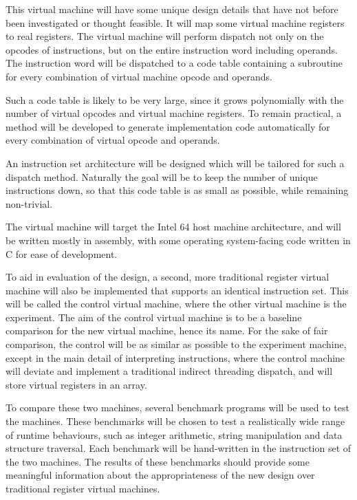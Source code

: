 		This virtual machine will have some unique design details that have not before been investigated or thought feasible. It will map some virtual machine registers to real registers. The virtual machine will perform dispatch not only on the opcodes of instructions, but on the entire instruction word including operands. The instruction word will be dispatched to a code table containing a subroutine for every combination of virtual machine opcode and operands. 
		
		Such a code table is likely to be very large, since it grows polynomially with the number of virtual opcodes and virtual machine registers. To remain practical, a method will be developed to generate implementation code automatically for every combination of virtual opcode and operands. 
	
		An instruction set architecture will be designed which will be tailored for such a dispatch method. Naturally the goal will be to keep the number of unique instructions down, so that this code table is as small as possible, while remaining non-trivial.
		
		The virtual machine will target the Intel 64 host machine architecture, and will be written mostly in assembly, with some operating system-facing code written in C for ease of development. 
		
		To aid in evaluation of the design, a second, more traditional register virtual machine will also be implemented that supports an identical instruction set. This will be called the control virtual machine, where the other virtual machine is the experiment. The aim of the control virtual machine is to be a baseline comparison for the new virtual machine, hence its name. For the sake of fair comparison, the control will be as similar as possible to the experiment machine, except in the main detail of interpreting instructions, where the control machine will deviate and implement a traditional indirect threading dispatch, and will store virtual registers in an array.
		
		To compare these two machines, several benchmark programs will be used to test the machines. These benchmarks will be chosen to test a realistically wide range of runtime behaviours, such as integer arithmetic, string manipulation and data structure traversal. Each benchmark will be hand-written in the instruction set of the two machines. The results of these benchmarks should provide some meaningful information about the appropriateness of the new design over traditional register virtual machines.
		
